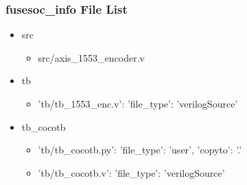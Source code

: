 \subsubsection{fusesoc\_info File List}
\begin{itemize}
\item src
	\begin{itemize}
	\item src/axis\_1553\_encoder.v
	\end{itemize}
\item tb
	\begin{itemize}
	\item {'tb/tb\_1553\_enc.v': {'file\_type': 'verilogSource'}}
	\end{itemize}
\item tb\_cocotb
	\begin{itemize}
	\item {'tb/tb\_cocotb.py': {'file\_type': 'user', 'copyto': '.'}}
	\item {'tb/tb\_cocotb.v': {'file\_type': 'verilogSource'}}
	\end{itemize}
\end{itemize}

